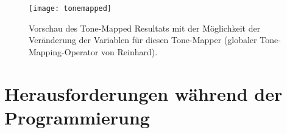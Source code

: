 \begin{figure}
  \begin{center}
    \texttt{[image: tonemapped]}
    \caption{Vorschau des Tone-Mapped Resultats mit der Möglichkeit der Veränderung der Variablen für diesen Tone-Mapper (globaler \gls{Tone-Mapping}-Operator von Reinhard).}
    \label{fig:app:tone}
  \end{center}
\end{figure}


\section{Herausforderungen während der Programmierung}